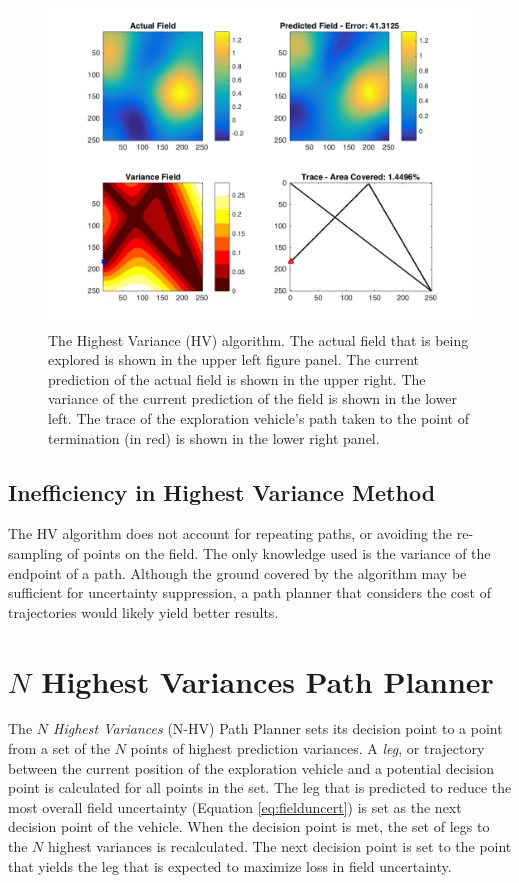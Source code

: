 \begin{figure}[hb!]
	\centering
	\includegraphics[width=0.95\linewidth]{figures/nhv_4panel.png}
    \captionsetup{skip=0.20\baselineskip}
	\ssp
	\caption{The Highest Variance (HV) algorithm. The actual field that is being explored is shown in the upper left figure panel. The current prediction of the actual field is shown in the upper right. The variance of the current prediction of the field is shown in the lower left. The trace of the exploration vehicle's path taken to the point of termination (in red) is shown in the lower right panel.}
	\label{fig:nhvpp}
\end{figure}

\subsection{Inefficiency in Highest Variance Method}
The HV algorithm does not account for repeating paths, or avoiding the re-sampling of points on the field. The only knowledge used is the variance of the endpoint of a path. Although the ground covered by the algorithm may be sufficient for uncertainty suppression, a path planner that considers the cost of trajectories would likely yield better results.

\section{$N$ Highest Variances Path Planner} \label{sec:nnhv}
The \textit{$N$ Highest Variances} (N-HV) Path Planner sets its decision point to a point from a set of the $N$ points of highest prediction variances. A \textit{leg}, or trajectory between the current position of the exploration vehicle and a potential decision point is calculated for all points in the set. The leg that is predicted to reduce the most overall field uncertainty (Equation \ref{eq:fielduncert}) is set as the next decision point of the vehicle. When the decision point is met, the set of legs to the $N$ highest variances is recalculated. The next decision point is set to the point that yields the leg that is expected to maximize loss in field uncertainty.


